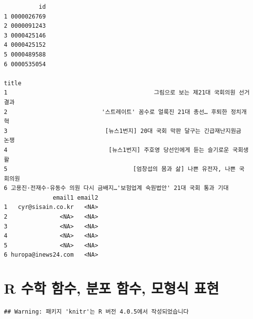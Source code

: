 \documentclass[
  11pt,
]{krantz}
\newenvironment{Shaded}{\begin{snugshade}}{\end{snugshade}}
\newcommand{\CommentTok}[1]{\textcolor[rgb]{0.37,0.37,0.37}{\textit{#1}}}
\begin{document}
\begin{verbatim}
          id
1 0000026769
2 0000091243
3 0000425146
4 0000425152
5 0000489588
6 0000535054
                                                                             title
1                                          그림으로 보는 제21대 국회의원 선거 결과
2                           '스트레이트' 꼼수로 얼룩진 21대 총선… 후퇴한 정치개혁
3                            [뉴스1번지] 20대 국회 막판 달구는 긴급재난지원금 논쟁
4                             [뉴스1번지] 주호영 당선인에게 듣는 슬기로운 국회생활
5                                    [엄창섭의 몸과 삶] 나쁜 유전자, 나쁜 국회의원
6 고용진·전재수·유동수 의원 다시 금배지…'보험업계 숙원법안' 21대 국회 통과 기대
              email1 email2
1   cyr@sisain.co.kr   <NA>
2               <NA>   <NA>
3               <NA>   <NA>
4               <NA>   <NA>
5               <NA>   <NA>
6 huropa@inews24.com   <NA>
\end{verbatim}

\begin{Shaded}
\end{Shaded}

\normalsize

\hypertarget{r-uxc218uxd559-uxd568uxc218-uxbd84uxd3ec-uxd568uxc218-uxbaa8uxd615uxc2dd-uxd45cuxd604}{%
\chapter{R 수학 함수, 분포 함수, 모형식 표현}\label{r-uxc218uxd559-uxd568uxc218-uxbd84uxd3ec-uxd568uxc218-uxbaa8uxd615uxc2dd-uxd45cuxd604}}

\begin{verbatim}
## Warning: 패키지 'knitr'는 R 버전 4.0.5에서 작성되었습니다
\end{verbatim}
\end{document}
